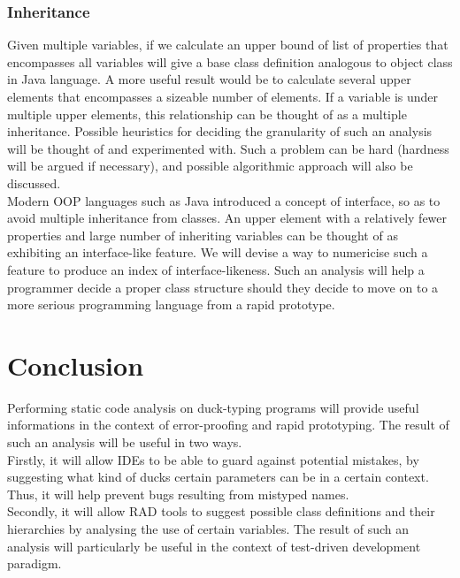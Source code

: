 \documentclass[a4paper,12pt]{article}
\begin{document}
\subsubsection{Inheritance}
Given multiple variables, if we calculate an upper bound of list of properties that encompasses all variables will give a base class definition analogous to object class in Java language. A more useful result would be to calculate several upper elements that encompasses a sizeable number of elements. If a variable is under multiple upper elements, this relationship can be thought of as a multiple inheritance. Possible heuristics for deciding the granularity of such an analysis will be thought of and experimented with. Such a problem can be hard (hardness will be argued if necessary), and possible algorithmic approach will also be discussed.\\
Modern OOP languages such as Java introduced a concept of interface, so as to 
avoid multiple inheritance from classes. An upper element with a relatively 
fewer properties and large number of inheriting variables can be thought of 
as exhibiting an interface-like feature. We will devise a way to numericise 
such a feature to produce an index of interface-likeness. Such an analysis 
will help a programmer decide a proper class structure should they decide to 
move on to a more serious programming language from a rapid prototype.
\section{Conclusion}
Performing static code analysis on duck-typing programs will provide useful 
informations in the context of error-proofing and rapid prototyping. The 
result of such an analysis will be useful in two ways.\\ 
Firstly, it will allow IDEs to be able to guard against potential mistakes, 
by suggesting what kind of ducks certain parameters can be in a certain 
context. Thus, it will help prevent bugs resulting from mistyped names.\\
Secondly, it will allow RAD tools to suggest possible class definitions and 
their hierarchies by analysing the use of certain variables. The result of 
such an analysis will particularly be useful in the context of test-driven 
development paradigm.\\
\end{document}
